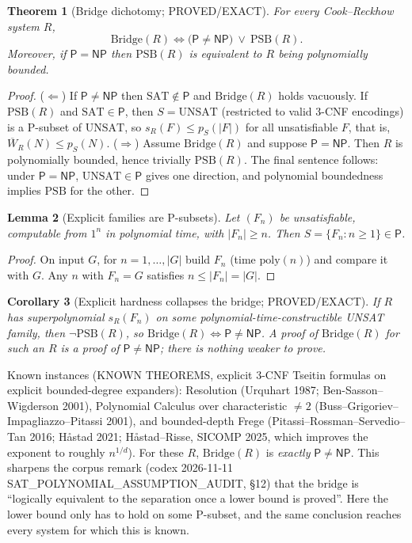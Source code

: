\documentclass[11pt]{article}
\newtheorem{theorem}{Theorem}
\newtheorem{lemma}[theorem]{Lemma}
\newtheorem{corollary}[theorem]{Corollary}
\theoremstyle{definition}
\newcommand{\Wbar}{\overline{W}}
\newcommand{\UNSAT}{\mathrm{UNSAT}}
\newcommand{\SAT}{\mathrm{SAT}}
\newcommand{\Pc}{\mathsf{P}}
\newcommand{\NP}{\mathsf{NP}}
\newcommand{\PSB}{\mathrm{PSB}}
\newcommand{\Bridge}{\mathrm{Bridge}}
\begin{document}
\begin{theorem}[Bridge dichotomy; PROVED/EXACT]\label{thm:dich}
For every Cook--Reckhow system $R$,
\[
 \Bridge(R)\iff\bigl(\Pc\ne\NP\bigr)\ \vee\ \PSB(R).
\]
Moreover, if $\Pc=\NP$ then $\PSB(R)$ is equivalent to $R$ being polynomially
bounded.
\end{theorem}
\begin{proof}
($\Leftarrow$) If $\Pc\ne\NP$ then $\SAT\notin\Pc$ and $\Bridge(R)$ holds
vacuously. If $\PSB(R)$ and $\SAT\in\Pc$, then $S=\UNSAT$ (restricted to valid
3-CNF encodings) is a P-subset of $\UNSAT$, so $s_R(F)\le p_S(|F|)$ for all
unsatisfiable $F$, that is, $\Wbar_R(N)\le p_S(N)$.
($\Rightarrow$) Assume $\Bridge(R)$ and suppose $\Pc=\NP$. Then $R$ is
polynomially bounded, hence trivially $\PSB(R)$.
The final sentence follows: under $\Pc=\NP$, $\UNSAT\in\Pc$ gives one direction,
and polynomial boundedness implies $\PSB$ for the other.
\end{proof}

\begin{lemma}[Explicit families are P-subsets]\label{lem:explicit}
Let $(F_n)$ be unsatisfiable, computable from $1^n$ in polynomial time, with
$|F_n|\ge n$. Then $S=\{F_n:n\ge1\}\in\Pc$.
\end{lemma}
\begin{proof}
On input $G$, for $n=1,\dots,|G|$ build $F_n$ (time $\mathrm{poly}(n)$) and
compare it with $G$. Any $n$ with $F_n=G$ satisfies $n\le|F_n|=|G|$.
\end{proof}

\begin{corollary}[Explicit hardness collapses the bridge; PROVED/EXACT]\label{cor:explicit}
If $R$ has superpolynomial $s_R(F_n)$ on some polynomial-time-constructible
UNSAT family, then $\neg\PSB(R)$, so $\Bridge(R)\iff\Pc\ne\NP$.
A proof of $\Bridge(R)$ for such an $R$ is a proof of $\Pc\ne\NP$; there is
nothing weaker to prove.
\end{corollary}

Known instances (KNOWN THEOREMS, explicit 3-CNF Tseitin formulas on explicit
bounded-degree expanders): Resolution (Urquhart 1987; Ben-Sasson--Wigderson
2001), Polynomial Calculus over characteristic $\ne2$
(Buss--Grigoriev--Impagliazzo--Pitassi 2001), and bounded-depth Frege
(Pitassi--Rossman--Servedio--Tan 2016; Håstad 2021; Håstad--Risse, SICOMP
2025, which improves the exponent to roughly $n^{1/d}$). For these $R$,
$\Bridge(R)$ is \emph{exactly} $\Pc\ne\NP$. This sharpens the corpus remark
(codex 2026-11-11 SAT\_POLYNOMIAL\_ASSUMPTION\_AUDIT, \S12) that the bridge is
``logically equivalent to the separation once a lower bound is proved''.
Here the lower bound only has to hold on some P-subset, and the same conclusion
reaches every system for which this is known.
\end{document}
